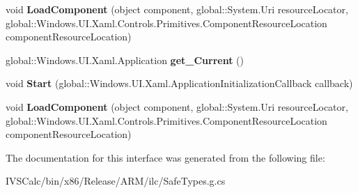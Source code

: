 \begin{DoxyCompactItemize}
void {\bfseries Load\+Component} (object component, global\+::\+System.\+Uri resource\+Locator, global\+::\+Windows.\+U\+I.\+Xaml.\+Controls.\+Primitives.\+Component\+Resource\+Location component\+Resource\+Location)
\item 
\mbox{\label{interface_windows_1_1_u_i_1_1_xaml_1_1_i_application_statics_a129c53c72c044776a1ea808234dc4e0a}} 
global\+::\+Windows.\+U\+I.\+Xaml.\+Application {\bfseries get\+\_\+\+Current} ()
\item 
\mbox{\label{interface_windows_1_1_u_i_1_1_xaml_1_1_i_application_statics_ac5636b6eb0ad2b58bdaae989c1e1ae9b}} 
void {\bfseries Start} (global\+::\+Windows.\+U\+I.\+Xaml.\+Application\+Initialization\+Callback callback)
\item 
\mbox{\label{interface_windows_1_1_u_i_1_1_xaml_1_1_i_application_statics_a634ebea47355c64e3699518f99f25457}} 
void {\bfseries Load\+Component} (object component, global\+::\+System.\+Uri resource\+Locator, global\+::\+Windows.\+U\+I.\+Xaml.\+Controls.\+Primitives.\+Component\+Resource\+Location component\+Resource\+Location)
\end{DoxyCompactItemize}


The documentation for this interface was generated from the following file\+:\begin{DoxyCompactItemize}
\item 
I\+V\+S\+Calc/bin/x86/\+Release/\+A\+R\+M/ilc/Safe\+Types.\+g.\+cs\end{DoxyCompactItemize}
